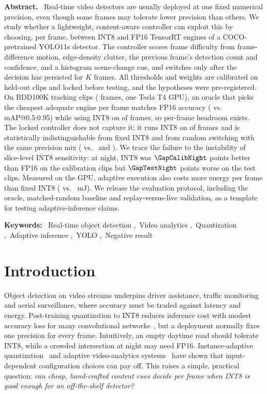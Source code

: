 \documentclass{svproc}
\providecommand{\and}{\quad}
\newenvironment{keywords}{\par\noindent\small\raggedright\textbf{Keywords:}~\def\and{\unskip,~}}{\par}
\renewenvironment{abstract}{\small\quotation\noindent\textbf{Abstract.}~}{\endquotation}
\begin{document}
\begin{abstract}
Real-time video detectors are usually deployed at one fixed numerical precision, even though some frames
may tolerate lower precision than others. We study whether a lightweight, content-aware controller can exploit
this by choosing, per frame, between INT8 and FP16 TensorRT engines of a COCO-pretrained YOLO11s detector. The controller scores frame difficulty from
frame-difference motion, edge-density clutter, the previous frame's detection count and confidence, and a
histogram scene-change cue, and switches only after the decision has persisted for $K$ frames. All thresholds and weights are calibrated on held-out clips and locked before testing, and the hypotheses were pre-registered.
On \TestClips{} BDD100K tracking clips (\TestFrames{} frames, one Tesla T4 GPU), an oracle that picks the
cheapest adequate engine per frame matches FP16 accuracy (\MapOracle{} vs.\ \MapFixedFPsixteen{} mAP@0.5:0.95)
while using INT8 on \FracINTeightOracle{} of frames, so per-frame headroom exists. The locked controller does not capture it: it
runs INT8 on \FracINTeightAdaptive{} of frames and is statistically indistinguishable from fixed INT8 and from
random switching with the same precision mix (\MapAdaptive{} vs.\ \MapFixedINTeight{} and \MapRandomMatched{}).
We trace the failure to the instability of slice-level INT8 sensitivity: at night, INT8 was
$\GapCalibNight$ points better than FP16 on the calibration clips but $\GapTestNight$ points worse on the test clips. Measured on the GPU, adaptive execution also
costs more energy per frame than fixed INT8 (\ETotalAdaptPipe{} vs.\ \ETotalINTeight{} mJ). We release the
evaluation protocol, including the oracle, matched-random baseline and replay-versus-live validation, as a template for testing adaptive-inference claims.
\end{abstract}
\begin{keywords}
Real-time object detection \and Video analytics \and Quantization \and Adaptive inference \and YOLO \and Negative result
\end{keywords}

\section{Introduction}
Object detection on video streams underpins driver assistance, traffic monitoring and aerial surveillance,
where accuracy must be traded against latency and energy. Post-training quantization to INT8 reduces inference
cost with modest accuracy loss for many convolutional networks~\cite{jacob2018,nagel2021}, but a deployment
normally fixes one precision for every frame. Intuitively, an empty daytime road should tolerate INT8, while a crowded
intersection at night may need FP16. Instance-adaptive quantization~\cite{liu2022} and adaptive video-analytics
systems~\cite{chameleon2018,adascale2019,approxdet2020} have shown that input-dependent configuration choices can pay
off. This raises a simple, practical question: \emph{can cheap, hand-crafted content cues decide per frame when INT8 is
good enough for an off-the-shelf detector?}
\end{document}
